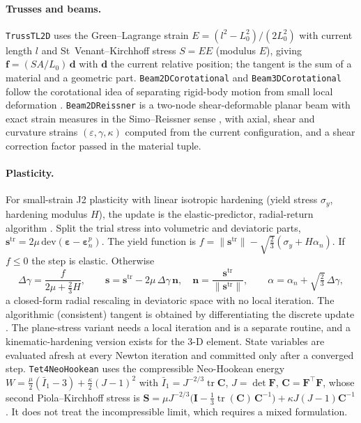 \paragraph{Trusses and beams.}
\texttt{TrussTL2D} uses the Green--Lagrange strain $E=(l^2-L_0^2)/(2L_0^2)$ with current length $l$ and St~Venant--Kirchhoff stress $S=EE$ (modulus $E$), giving
$\bm f=(SA/L_0)\,\bm d$ with $\bm d$ the current relative position; the tangent is the sum of a material and a geometric part.
\texttt{Beam2DCorotational} and \texttt{Beam3DCorotational} follow the corotational idea of separating rigid-body motion from small local deformation \cite{crisfield1990corot}.
\texttt{Beam2DReissner} is a two-node shear-deformable planar beam with exact strain measures in the Simo--Reissner sense \cite{simo1985beam}, with axial, shear and curvature strains $(\varepsilon,\gamma,\kappa)$
computed from the current configuration, and a shear correction factor passed in the material tuple.

\paragraph{Plasticity.}
For small-strain J2 plasticity with linear isotropic hardening (yield stress $\sigma_y$, hardening modulus $H$), the update is the elastic-predictor, radial-return algorithm \cite{simo1985tangent,simo1998inelasticity}.
Split the trial stress into volumetric and deviatoric parts, $\bm s^{\mathrm{tr}}=2\mu\,\mathrm{dev}(\bm\varepsilon-\bm\varepsilon^p_n)$. The yield function is
$f=\|\bm s^{\mathrm{tr}}\|-\sqrt{\tfrac23}(\sigma_y+H\alpha_n)$. If $f\le0$ the step is elastic. Otherwise
\begin{equation}
  \Delta\gamma=\frac{f}{2\mu+\tfrac23H},\qquad
  \bm s=\bm s^{\mathrm{tr}}-2\mu\,\Delta\gamma\,\bm n,\quad \bm n=\frac{\bm s^{\mathrm{tr}}}{\|\bm s^{\mathrm{tr}}\|},\qquad
  \alpha=\alpha_n+\sqrt{\tfrac23}\,\Delta\gamma,
  \label{eq:j2}
\end{equation}
a closed-form radial rescaling in deviatoric space with no local iteration. The algorithmic (consistent) tangent is obtained by differentiating the discrete update \cite{simo1985tangent}. The plane-stress variant
needs a local iteration and is a separate routine, and a kinematic-hardening version exists for the 3-D element.
State variables are evaluated afresh at every Newton iteration and committed only after a converged step.
\texttt{Tet4NeoHookean} uses the compressible Neo-Hookean energy $W=\tfrac{\mu}{2}(\bar I_1-3)+\tfrac{\kappa}{2}(J-1)^2$ with $\bar I_1=J^{-2/3}\operatorname{tr}\bm C$, $J=\det\bm F$,
$\bm C=\bm F^{\!\top}\bm F$, whose second Piola--Kirchhoff stress is
$\bm S=\mu J^{-2/3}\bigl(\bm I-\tfrac13\operatorname{tr}(\bm C)\,\bm C^{-1}\bigr)+\kappa J(J-1)\bm C^{-1}$. It does not treat the incompressible limit, which requires a mixed formulation.

